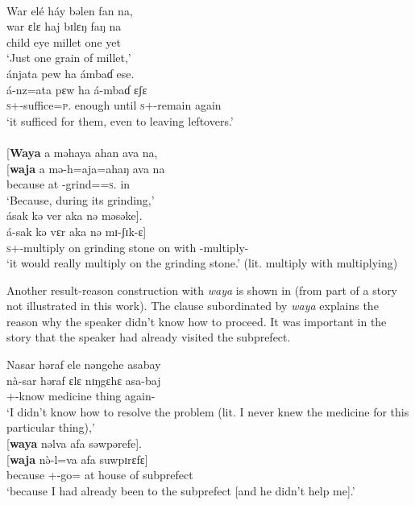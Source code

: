 \ea \label{ex:12:35}
\\
War  elé  háy  bəlen  fan  na,\\  
\gll  war ɛlɛ haj bɪlɛŋ faŋ na\\ 
      child   eye   millet   one    yet   {\PSP}\\     
\glt ‘Just one grain of millet,’\\

\medskip
ánjata  pew  ha  ámbaɗ  ese.\\  
\gll á-nz=ata pɛw ha á-mbaɗ ɛʃɛ \\ 
     \textsc{s}+{\IFV}-suffice=\textsc{p}.{\IO} enough   until  \textsc{s}+{\IFV}-remain   again \\
\glt ‘it sufficed for them, even to leaving leftovers.’\\

\medskip{}\\\relax
{}[\textbf{Waya}  a  məhaya  ahan  ava  na,\\  
\gll {}[\textbf{waja}  a mə-h=aja=ahaŋ ava na\\ 
     because  at   {\NOM}{}-grind={\PLU}=\textsc{s}.{\POSS}   in   {\PSP}  \\ 
\glt ‘Because, during its grinding,’\\

\medskip
ásak  kə  ver  aka  nə  məsəke].\\
\gll á-sak kə vɛr aka nə mɪ-ʃɪk-ɛ]\\
     \textsc{s}+{\IFV}-multiply   on   {grinding stone}    on    with   {\NOM}{}-multiply-{\CL}\\
\glt  ‘it would really multiply on the grinding stone.’ (lit. multiply with multiplying)  
\z 

Another result-reason construction with \textit{waya} is shown in  (from part of a story not illustrated in this work).  The clause subordinated by \textit{waya} explains the reason why the speaker didn’t know how to proceed. It was important in the story that the speaker had already visited the subprefect.

\ea \label{ex:12:36}
Nasar  həraf  ele  nəngehe  asabay\\  
\gll  nà-sar    həraf    ɛlɛ  nɪŋgɛhɛ  asa-baj \\
      {\oneS}+{\PFV}-know  medicine   thing  {\DEM}  again-{\NEG} \\ 
\glt ‘I didn’t know how to resolve the problem (lit. I never knew the medicine for this particular thing),’\\
\clearpage
\medskip
{}[\textbf{waya} nəlva  afa  səwpərefe].\\
\gll {}[\textbf{waja} n\`{ə}-l=va afa suwpɪrɛfɛ]\\
     because  {\oneS}+{\PFV}-go={\PRF}    {at house of}    {subprefect}\\
\glt  ‘because I had already been to the subprefect [and he didn’t help me].’ 
\z 

